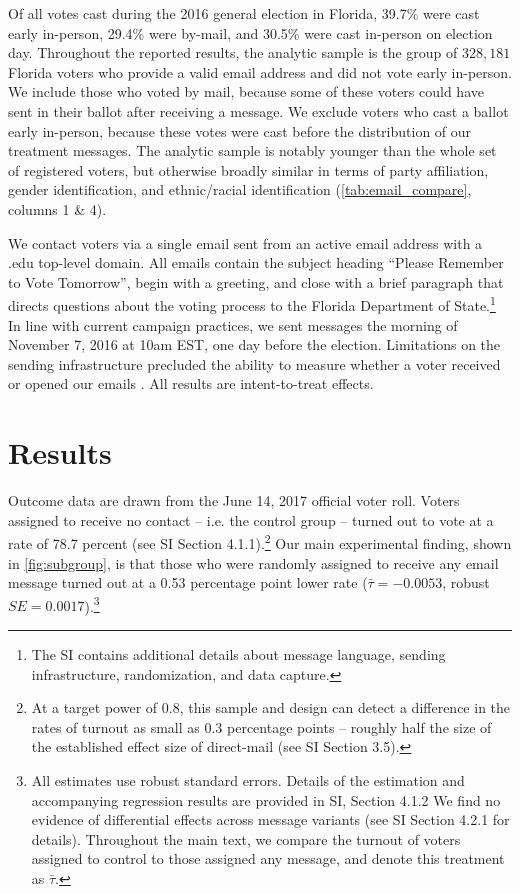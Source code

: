 \documentclass[12pt]{article}
\begin{document}
Of all votes cast during the 2016 general election in Florida, 39.7\%
were cast early in-person, 29.4\% were by-mail, and 30.5\% were cast
in-person on election day. Throughout the reported results, the
analytic sample is the group of $328,181$ Florida voters who provide a
valid email address and did not vote early in-person. We include those
who voted by mail, because some of these voters could have sent in
their ballot after receiving a message. We exclude voters who cast
a ballot early in-person, because these votes were cast before the
distribution of our treatment messages. The analytic sample is notably
younger than the whole set of registered voters, but otherwise broadly
similar in terms of party affiliation, gender identification, and
ethnic/racial identification (\autoref{tab:email_compare}, columns 1
\& 4).



We contact voters via a single email sent from an active email address
with a .edu top-level domain. All emails contain the subject heading
``Please Remember to Vote Tomorrow'', begin with a greeting, and close
with a brief paragraph that directs questions about the voting process
to the Florida Department of State.\footnote{The SI contains
  additional details about message language, sending infrastructure,
  randomization, and data capture.}  In line with current campaign
practices, we sent messages the morning of November 7, 2016 at 10am
EST, one day before the election. Limitations on the sending
infrastructure precluded the ability to measure whether a voter
received or opened our emails \citep{hughes2019}. All results are
intent-to-treat effects.

\section{Results}

Outcome data are drawn from the June 14, 2017 official voter roll.
Voters assigned to receive no contact -- i.e. the control group --
turned out to vote at a rate of 78.7 percent (see SI Section
4.1.1).\footnote{At a target power of 0.8, this sample and design
  can detect a difference in the rates of turnout as small as 0.3
  percentage points -- roughly half the size of the established effect
  size of direct-mail (see SI Section 3.5).}  Our main experimental
finding, shown in \autoref{fig:subgroup}, is that those who were
randomly assigned to receive any email message turned out at a 0.53
percentage point lower rate ($\bar{\tau} = -0.0053$, robust
$SE = 0.0017$).\footnote{All estimates use robust standard
  errors. Details of the estimation and accompanying regression
  results are provided in SI, Section 4.1.2 We find no evidence of
  differential effects across message variants (see SI Section 4.2.1
  for details). Throughout the main text, we compare the turnout of
  voters assigned to control to those assigned any message, and denote
  this treatment as $\bar{\tau}$. }
\end{document}
